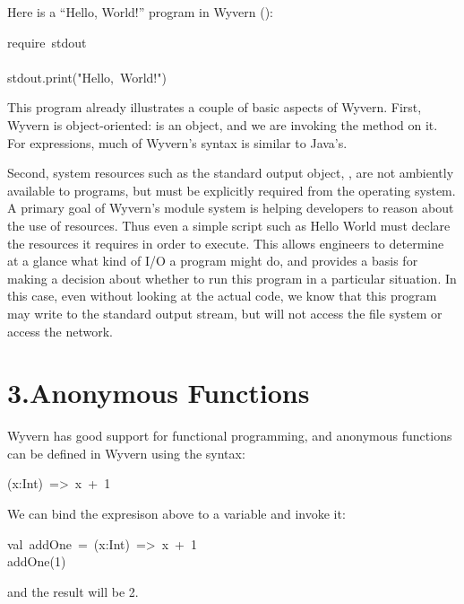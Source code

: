\documentclass{article}
\begin{document}
\noindent{}Here is a \textquotedblleft{}Hello, World!\textquotedblright{} program in Wyvern ():%
\begin{mdpre}%
\noindent require~stdout\\
\\
stdout.print("Hello,~World!")%
\end{mdpre}\noindent{}This program already illustrates a couple of basic aspects of Wyvern.  First,
Wyvern is object-oriented:  is an object, and we are invoking the
 method on it.  For expressions, much of Wyvern's syntax is similar
to Java's.

Second, system resources such as the standard output object, ,
are not ambiently available to programs, but must be explicitly required
from the operating system.  A primary goal of Wyvern's module system
is helping developers to reason about the use of resources.  Thus even
a simple script such as Hello World must declare the resources it
requires in order to execute.  This allows engineers to determine at a
glance what kind of I/O a program might do, and provides a basis for
making a decision about whether to run this program in a particular
situation.  In this case, even without looking at the actual code, we
know that this program may write to the standard output stream, but will
not access the file system or access the network.%

\section{3.\hspace*{0.5em}Anonymous Functions}\label{sec-anonymous-functions}%

\noindent{}Wyvern has good support for functional programming, and anonymous functions can be defined in Wyvern using the syntax:%
\begin{mdpre}%
\noindent(x:Int)~=\textgreater{}~x~+~1%
\end{mdpre}\noindent{}We can bind the expresison above to a variable and invoke it:
\begin{mdpre}%
\noindent val~addOne~=~(x:Int)~=\textgreater{}~x~+~1\\
addOne(1)\\
\end{mdpre}\noindent{}and the result will be 2.
\end{document}
